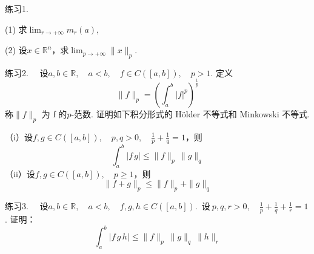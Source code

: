 \documentclass{article}
\begin{document}
\newpage

\noindent 练习1.

\noindent (1) 求\(\lim_{r \to + \infty }m_r(a) \),

\noindent (2) 设\(x \in \mathbb{R}^n\)，求\(\lim_{p \to + \infty }\|x\|_p \).

\vspace{20pt}

\noindent 练习2. \ \ 设\(a, b \in \mathbb{R},\quad a < b,\quad f \in C \left( [a,b] \right),\quad p > 1 \). 定义
\begin{equation*}
    \|f\|_p = \left( \int_{a}^{b} | f |^p  \right)^\frac{1}{p}
\end{equation*}
称\(\|f\|_p\) 为 f 的\(p\)-范数. 证明如下积分形式的 H\"older 不等式和 Minkowski 不等式.
\vspace{10pt}

\noindent（i）设\(f, g \in C \left( [a,b] \right),\quad p, q > 0,\quad \frac{1}{p } + \frac{1}{q} = 1 \)，则
\begin{equation*}
    \int_{a}^{b}| f\,g |  \le \|f\|_p\,\|g\|_q
\end{equation*}
（ii）设\(f, g \in C \left( [a,b] \right),\quad p \ge 1\)，则
\begin{equation*}
    \|f + g\|_p \le \|f\|_p +\|g\|_q
\end{equation*}

\vspace{20pt}

\noindent 练习3. \ \ 设\(a, b \in \mathbb{R},\quad a < b,\quad f, g, h \in C \left( [a,b] \right)\).\ 设\(\ p, q, r > 0,\quad \frac{1}{p} + \frac{1}{q} + \frac{1}{r} = 1\). 证明：
\begin{equation*}
    \int_{a}^{b} | f \, g \, h | \le \|f\|_p\ \|g\|_q\ \|h\|_r
\end{equation*}
\end{document}
